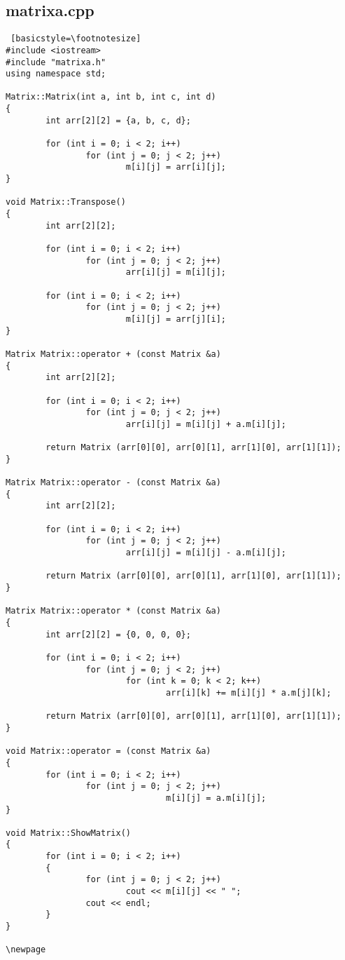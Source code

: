 \documentclass[twoside,twocolumn]{article}
\begin{document}
\subsection{matrixa.cpp}
\begin{lstlisting} [basicstyle=\footnotesize]
#include <iostream>
#include "matrixa.h"
using namespace std;

Matrix::Matrix(int a, int b, int c, int d)
{
        int arr[2][2] = {a, b, c, d};

        for (int i = 0; i < 2; i++)
                for (int j = 0; j < 2; j++)
                        m[i][j] = arr[i][j];
}

void Matrix::Transpose()
{
        int arr[2][2];

        for (int i = 0; i < 2; i++)
                for (int j = 0; j < 2; j++)
                        arr[i][j] = m[i][j];

        for (int i = 0; i < 2; i++)
                for (int j = 0; j < 2; j++)
                        m[i][j] = arr[j][i];
}

Matrix Matrix::operator + (const Matrix &a)
{
        int arr[2][2];

        for (int i = 0; i < 2; i++)
                for (int j = 0; j < 2; j++)
                        arr[i][j] = m[i][j] + a.m[i][j];

        return Matrix (arr[0][0], arr[0][1], arr[1][0], arr[1][1]);
}

Matrix Matrix::operator - (const Matrix &a)
{
        int arr[2][2];

        for (int i = 0; i < 2; i++)
                for (int j = 0; j < 2; j++)
                        arr[i][j] = m[i][j] - a.m[i][j];

        return Matrix (arr[0][0], arr[0][1], arr[1][0], arr[1][1]);
}

Matrix Matrix::operator * (const Matrix &a)
{
        int arr[2][2] = {0, 0, 0, 0};

        for (int i = 0; i < 2; i++)
                for (int j = 0; j < 2; j++)
                        for (int k = 0; k < 2; k++)
                                arr[i][k] += m[i][j] * a.m[j][k];

        return Matrix (arr[0][0], arr[0][1], arr[1][0], arr[1][1]);
}

void Matrix::operator = (const Matrix &a)
{
        for (int i = 0; i < 2; i++)
                for (int j = 0; j < 2; j++)
                                m[i][j] = a.m[i][j];
}

void Matrix::ShowMatrix()
{
        for (int i = 0; i < 2; i++)
        {
                for (int j = 0; j < 2; j++)
                        cout << m[i][j] << " ";
                cout << endl;
        }
}

\newpage

\end{lstlisting}
\end{document}
